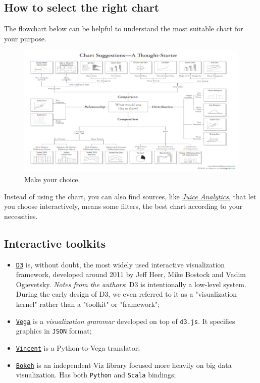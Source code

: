 \subsection*{How to select the right chart}

The flowchart below can be helpful to understand the most suitable chart for your purpose.

\begin{figure}[H]%
 \centering
 \includegraphics[width=16cm]{./img/06/flow_chart}
 \caption{\label{pic:flow_chart} Make your choice.}
\end{figure}

Instead of using the chart, you can also find sources, like \href{http://www.juiceanalytics.com}{\emph{Juice Analytics}}, that let you choose interactively, means some filters, the best chart according to your necessities.

\subsection{Interactive toolkits}

\begin{itemize}
\item \href{https://d3js.org}{\texttt{D3}} is, without doubt, the most widely used interactive visualization framework, developed around 2011 by Jeff Heer, Mike Bostock and Vadim Ogievetsky. \emph{Notes from the authors}: D3 is intentionally a low-level system. During the early design of D3, we even referred to it as a "visualization kernel" rather than a "toolkit" or "framework";

\item \href{https://vega.github.io/}{\texttt{Vega}} is a \emph{visualization grammar} developed on top of \texttt{d3.js}. It specifies graphics in \texttt{JSON} format;

\item \href{https://vega.github.io/vega/}{\texttt{Vincent}} is a Python-to-Vega translator;

\item \href{http://bokeh.pydata.org/en/latest/}{\texttt{Bokeh}} is an independent Viz library focused more heavily on big data visualization. Has both \texttt{Python} and \texttt{Scala} bindings; 

\end{itemize}
